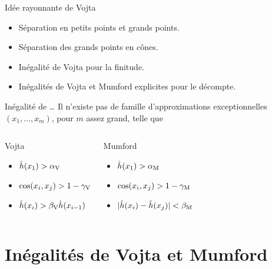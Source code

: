 \documentclass{mpg-thslides}
\begin{document}
\begin{frame}{Idée rayonnante de Vojta}
  \begin{itemize}
    \item Séparation en petits points et grands points.
    \item Séparation des grands points en cônes.
    \item Inégalité de Vojta pour la finitude.
    \item Inégalités de Vojta et Mumford explicites pour le décompte.
  \end{itemize}
  \begin{block}{Inégalité de \dots}
    Il n'existe pas de famille d'approximations exceptionnelles \( (x_1,
      \dots, x_m) \), pour \( m \) assez grand, telle que
  \begin{columns}
    \begin{block}{Vojta}
      \begin{itemize}
        \item \( \hat h (x_1) > \alpha \sb{\mathrm{V}} \)
        \item \( \cos(x_i, x_j) > 1 - \gamma \sb{\mathrm{V}} \)
        \item \( \hat h (x_i) > \beta \sb{\mathrm{V}} \hat h (x_{i-1}) \)
      \end{itemize}
    \end{block}
    \begin{block}{Mumford}
      \begin{itemize}
        \item \( \hat h (x_1) > \alpha \sb{\mathrm{M}} \)
        \item \( \cos(x_i, x_j) > 1 - \gamma \sb{\mathrm{M}} \)
        \item \( \lvert \hat h (x_i) - \hat h (x_j) \rvert < \beta \sb{\mathrm{M}} \)
      \end{itemize}
    \end{block}
  \end{columns}
\end{block}
\end{frame}



\section[Inégalités]{Inégalités de Vojta et Mumford}
\tocsect
\end{document}
